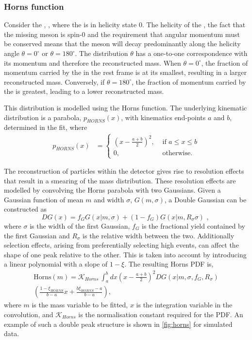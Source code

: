 \subsubsection{Horns function}

Consider the \decay{\Bm}{\Dstarz\Kstarm}, \decay{\Dstarz}{\Dz\piz}, where the \Dstarz is in helicity state 0. The helicity of the \Dstarz, the fact that the missing \piz meson is spin-0 and the requirement that angular momentum must be conserved means that the \piz meson will decay predominantly along the helicity angle $\theta = 0^{\circ}$ or $\theta = 180^{\circ}$. The distribution $\theta$ has a one-to-one correspondence with its momentum and therefore the reconstructed \Bm mass. When $\theta = 0^{\circ}$, the fraction of momentum carried by the \piz in the \Bm rest frame is at its smallest, resulting in a larger reconstructed \Bm mass. Conversely, if $\theta = 180^{\circ}$, the fraction of momentum carried by the \piz is greatest, leading to a lower reconstructed \Bm mass.

This distribution is modelled using the Horns function. The underlying kinematic distribution is a parabola, $p_{HORNS}(x)$, with kinematics end-points $a$ and $b$, determined in the fit, where
\begin{align}
p_{HORNS}(x) &= \begin{cases}
\left(x - \frac{a+b}{2}\right)^2, & \text{ if $a \leq x \leq b$}\\ 	
0, & \text{ otherwise.}
\end{cases} 
\end{align}

The reconstruction of particles within the \lhcb detector gives rise to resolution effects that result in a smearing of the mass distribution. These resolution effects are modelled by convolving the Horns parabola with two Gaussians. Given a Gaussian function of mean $m$ and width $\sigma$, $G(m,\sigma)$, a Double Gaussian can be constructed as
\begin{equation}
DG(x) = f_G G(x|m,\sigma) + \left(1-f_G\right) G(x|m,R_{\sigma}\sigma) \text{ , }
\end{equation}
where $\sigma$ is the width of the first Gaussian, $f_G$ is the fractional yield contained by the first Gaussian and $R_{\sigma}$ is the relative width between the two. Additionally selection effects, arising from preferentially selecting high \pt events, can affect the shape of one peak relative to the other. This is taken into account by introducing a linear polynomial with a slope of $1 - \xi$. The resulting Horns PDF is,
\begin{multline}
\text{Horns}(m) = \mathcal{K}_{Horns}\ \int_a^b dx \left(x - \frac{a+b}{2}\right)^2 DG(x|m,\sigma,f_G,R_{\sigma}) \\
\left( \frac{1 - \xi_{HORNS}}{b - a}x + \frac{b\xi_{HORNS} - a}{b - a}\right),
\label{eqn:horns}
\end{multline}
where $m$ is the mass variable to be fitted, $x$ is the integration variable in the convolution, and $\mathcal{K}_{Horns}$ is the normalisation constant required for the PDF. An example of such a double peak structure is shown in \fig\ref{fig:horns} for simulated data.


